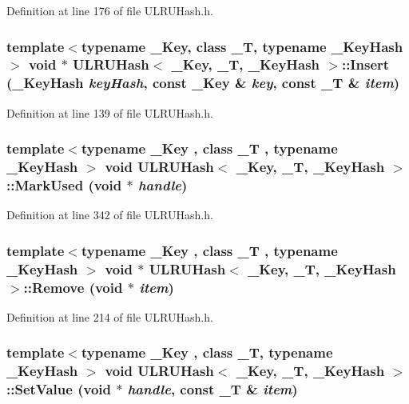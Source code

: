 Definition at line 176 of file ULRUHash.h.\hypertarget{class_u_l_r_u_hash_ad3291d30433c9dfc058f4ea14f4aa52}{
\subsubsection[{Insert}]{\setlength{\rightskip}{0pt plus 5cm}template$<$typename \_\-Key, class \_\-T, typename \_\-KeyHash$>$ void $\ast$ {\bf ULRUHash}$<$ \_\-Key, \_\-T, \_\-KeyHash $>$::Insert (\_\-KeyHash {\em keyHash}, \/  const \_\-Key \& {\em key}, \/  const \_\-T \& {\em item})}}
\label{class_u_l_r_u_hash_ad3291d30433c9dfc058f4ea14f4aa52}




Definition at line 139 of file ULRUHash.h.\hypertarget{class_u_l_r_u_hash_a4863fdfd290e1a381bcc77025698f11}{
\subsubsection[{MarkUsed}]{\setlength{\rightskip}{0pt plus 5cm}template$<$typename \_\-Key , class \_\-T , typename \_\-KeyHash $>$ void {\bf ULRUHash}$<$ \_\-Key, \_\-T, \_\-KeyHash $>$::MarkUsed (void $\ast$ {\em handle})}}
\label{class_u_l_r_u_hash_a4863fdfd290e1a381bcc77025698f11}




Definition at line 342 of file ULRUHash.h.\hypertarget{class_u_l_r_u_hash_622e00cdeeb6004d61142319db0e1741}{
\subsubsection[{Remove}]{\setlength{\rightskip}{0pt plus 5cm}template$<$typename \_\-Key , class \_\-T , typename \_\-KeyHash $>$ void $\ast$ {\bf ULRUHash}$<$ \_\-Key, \_\-T, \_\-KeyHash $>$::Remove (void $\ast$ {\em item})}}
\label{class_u_l_r_u_hash_622e00cdeeb6004d61142319db0e1741}




Definition at line 214 of file ULRUHash.h.\hypertarget{class_u_l_r_u_hash_79fd6e7b60a39eb34eb0299c791d13b5}{
\subsubsection[{SetValue}]{\setlength{\rightskip}{0pt plus 5cm}template$<$typename \_\-Key , class \_\-T, typename \_\-KeyHash $>$ void {\bf ULRUHash}$<$ \_\-Key, \_\-T, \_\-KeyHash $>$::SetValue (void $\ast$ {\em handle}, \/  const \_\-T \& {\em item})}}
\label{class_u_l_r_u_hash_79fd6e7b60a39eb34eb0299c791d13b5}




